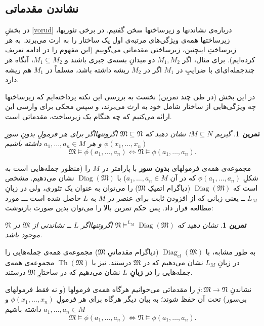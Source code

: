 \documentclass[12pt,a4paper]{report}
\theoremstyle{colorhead}
\newtheorem{tam}[thm]{تمرین}
\DeclareMathOperator{\Th}{Th}
\DeclareMathOperator{\diag}{Diag}
\begin{document}
\subsection{ نشاندن مقدماتی}
در بخشِ
\ref{vorud}
درباره‌ی نشاندنها و زیرساختها سخن گفتیم. در برخی تئوریها، زیرساختها همه‌ی ویژگی‌های مرتبه‌ی اول یک ساختار را به ارث می‌برند. به هر زیرساختِ اینچنین، زیرساختی مقدماتی می‌گوییم (این مفهوم را در ادامه تعریف کرده‌ایم).
برای مثال، اگر
$M_1,M_2$
دو میدانِ بسته‌ی جبری باشند و 
$M_1\subseteq M_2$،
آنگاه هر چندجمله‌ای‌ای با ضرایبِ در
$M_1$
اگر در
$M_2$
ریشه داشته باشد، مسلماً در
$M_1$
هم ریشه دارد. 
\par 
در این بخش  (در طی چند تمرین) نخست به بررسی این نکته پرداخته‌ایم که زیرساختها چه ويژگی‌هایی از
 ساختار شامل خود 
به ارث می‌برند،‌ و سپس محکی برای وارسی این ارائه می‌کنیم  که 
چه هنگام یک زیرساخت، مقدماتی است.
\begin{tam}
گیریم
$M\subseteq N$؛
نشان دهید که
$\mathfrak{M}\subseteq \mathfrak{N}$
اگروتنهااگر برای هر فرمولِ
بدونِ سورِ
$\phi(x_1,\ldots,x_n)$
و هر
$a_1,\ldots, a_n\in M$
داشته باشیم
\[
\mathfrak{M}\models \phi(a_1,\ldots,a_n)\Leftrightarrow\mathfrak{N}\models \phi(a_1,\ldots,a_n).
\]
\end{tam}
مجموعه‌ی همه‌ی فرمولهای \textbf{بدون سور} با پارامتر در
$M$
را 
(منظور جمله‌هایی است به شکلِ
$\phi(a_1,\ldots,a_n)$
که در آن
$a_1,\ldots,a_n\in M$)
با
$\diag(\mathfrak{M})$
نشان می‌دهیم. مشخص است که
$\diag(\mathfrak{M})$
(دیاگرام اتمیکِ
$\mathfrak{M}$)
را می‌توان به عنوان یک تئوری، ولی در زبانِ
$L_M$ ــ
یعنی زبانی که از افزودن ثابت برای عنصر در
$M$
به
$L$ 
حاصل شده است ـــ
 مورد مطالعه قرار داد.
پس حکم تمرین بالا را می‌توان بدین صورت بازنوشت:
\begin{tam}
نشان دهید که
$\mathfrak{N}\models^{L_M} \diag(\mathfrak{M})$
اگروتنهااگر 
$L$ ــ
نشاندنی از 
$\mathfrak{M}$
در
$\mathfrak{N}$
موجود باشد.
\end{tam}
\par 
به طور مشابه،‌ با
$\diag_{el}(\mathfrak{M})$
(دیاگرام مقدماتیِ
$\mathfrak{M}$)
مجموعه‌ی همه‌ی جمله‌هایی را در زبانِ
$L_M$
نشان می‌دهیم که در
$\mathfrak{M}$
درستند. 
نیز با
$\Th(\mathfrak{M})$
مجموعه‌ی همه‌ی جمله‌هایی را 
\textbf{در زبانِ
$L$}
نشان می‌دهیم که در ساختارِ
$\mathfrak{M}$
درستند. 
\par 
نشاندنِ
$j:\mathfrak{M}\to \mathfrak{N}$
را مقدماتی می‌خوانیم هرگاه همه‌ی فرمولها (و نه فقط فرمولهای بی‌سور) تحت آن حفظ شوند؛ به بیان دیگر هرگاه
برای هر فرمولِ
$\phi(x_1,\ldots,x_n)$
و
$a_1,\ldots,a_n\in M$
داشته باشیم
\[
\mathfrak{M}\models \phi(a_1,\ldots,a_n)\Leftrightarrow\mathfrak{N}\models
\phi(a_1,\ldots,a_n).
\]
\end{document}
